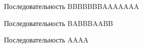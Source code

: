 \documentclass[a5paper,10pt, twoside]{article} %
\begin{document}
  \begin{center}
    \begin{figure}[h!]
        \caption{Последовательность BBBBBBBAAAAAAA}
    \end{figure}
  \end{center}

\newpage

  \begin{center}
    \begin{figure}[h!]
        \caption{Последовательность BABBBAABB}
    \end{figure}
  \end{center}
  
    \begin{center}
    \begin{figure}[h!]
        \caption{Последовательность AAAA}
    \end{figure}
  \end{center}
\end{document}
